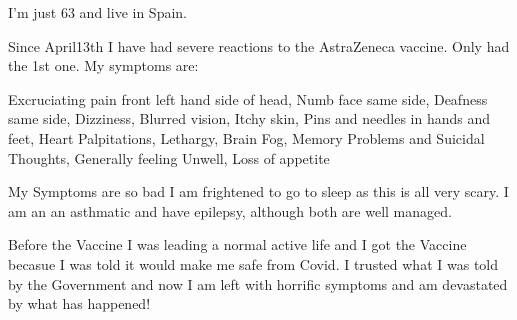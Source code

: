 I’m just 63 and live in Spain.

Since April13th I have had severe reactions to the AstraZeneca vaccine. Only had
the 1st one. My symptoms are:

Excruciating pain front left hand side of head, Numb face same side, Deafness
same side, Dizziness, Blurred vision, Itchy skin, Pins and needles in hands and
feet, Heart Palpitations, Lethargy, Brain Fog, Memory Problems and Suicidal
Thoughts, Generally feeling Unwell, Loss of appetite

My Symptoms are so bad I am frightened to go to sleep as this is all very
scary. I am an an asthmatic and have epilepsy, although both are well managed.

Before the Vaccine I was leading a normal active life and I got the Vaccine
becasue I was told it would make me safe from Covid. I trusted what I was told
by the Government and now I am left with horrific symptoms and am devastated by
what has happened!

